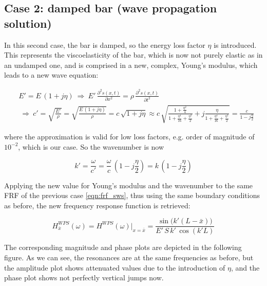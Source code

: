 \documentclass[a4paper,12pt,oneside]{article}
\begin{document}
\clearpage

\begin{figure}[h]
	\vspace{50pt}
	\centering
	\def\svgwidth{\columnwidth}
	
\end{figure}

\subsection*{Case 2: damped bar (wave propagation solution)}

In this second case, the bar is damped, so the energy loss factor $ \eta $ is introduced. This represents the viscoelasticity of the bar, which is now not purely elastic as in an undamped one, and is comprised in a new, complex, Young's modulus, which leads to a new wave equation:

\[ \begin{split}
	& E' = E \, (1 + j \eta) ~ \Rightarrow ~
		E' \,	\frac{\partial^2 s(x,t)}{\partial x^2} =
		\rho \, \frac{\partial^2 s(x,t)}{\partial t^2} \\
	& ~ \Rightarrow ~ c' = \sqrt{\frac{E'}{\rho}} = \sqrt{\frac{E \,(1 + j \eta)}{\rho}}
		= c \, \sqrt{1 + j \eta} \approx
		c \, \sqrt{\frac{1 + \frac{\eta^2}{4}}{1 + \frac{\eta^4}{16} + \frac{\eta^2}{2}} +
		j \frac{\eta}{1 + \frac{\eta^4}{16} + \frac{\eta^2}{2}}}
		= \frac{c}{1 - j \frac{\eta}{2}}
\end{split} \]

where the approximation is valid for low loss factors, e.g. order of magnitude of $ 10^{-2} $, which is our case. So the wavenumber is now

\[
	k' = \frac{\omega}{c'} = \frac{\omega}{c} \, (1 - j \frac{\eta}{2})
		= k \, (1 - j \frac{\eta}{2})
\]

Applying the new value for Young's modulus and the wavenumber to the same FRF of the previous case \eqref{eqn:frf_sws}, thus using the same boundary conditions as before, the new frequency response function is retrieved:

\[
	H^{WPS}_{\bar{x}}(\omega) = H^{WPS}(\omega)\big|_{x = \bar{x}} =
		\frac{\sin\bigl(k'(L - \bar{x})\bigr)}{E' \, S \, k' \, \cos(k'L)}
\]

\vspace{10pt}

The corresponding magnitude and phase plots are depicted in the following figure. As we can see, the resonances are at the same frequencies as before, but the amplitude plot shows attenuated values due to the introduction of $ \eta $, and the phase plot shows not perfectly vertical jumps now.
\end{document}
